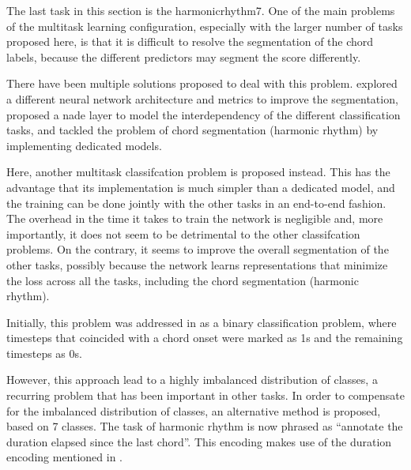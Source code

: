 
The last task in this section is the \gls{harmonicrhythm7}.
One of the main problems of the multitask learning
configuration, especially with the larger number of tasks
proposed here, is that it is difficult to resolve the
segmentation of the chord labels, because the different
predictors may segment the score differently.

There have been multiple solutions proposed to deal with
this problem. \textcite{chen2021attend} explored a different
neural network architecture and metrics to improve the
segmentation, \textcite{micchi2021deep} proposed a
\gls{nade} layer to model the interdependency of the
different classification tasks, \textcite{mcleod2021modular}
and  \textcite{wu2021melody} tackled the problem of chord
segmentation (harmonic rhythm) by implementing dedicated
models. 

Here, another multitask classifcation problem is proposed
instead. This has the advantage that its implementation is
much simpler than a dedicated model, and the training can be
done jointly with the other tasks in an end-to-end fashion.
The overhead in the time it takes to train the network is
negligible and, more importantly, it does not seem to be
detrimental to the other classifcation problems. On the
contrary, it seems to improve the overall segmentation of
the other tasks, possibly because the network learns
representations that minimize the loss across all the tasks,
including the chord segmentation (harmonic rhythm).

Initially, this problem was addressed in
\textcite{napoleslopez2021augmentednet} as a binary
classification problem, where timesteps that coincided with
a chord onset were marked as 1s and the remaining timesteps
as 0s.

However, this approach lead to a highly imbalanced
distribution of classes, a recurring problem that has been
important in other tasks. In order to compensate for the
imbalanced distribution of classes, an alternative method is
proposed, based on 7 classes. The task of harmonic rhythm is
now phrased as ``annotate the duration elapsed since the
last chord''. This encoding makes use of the duration
encoding mentioned in .
